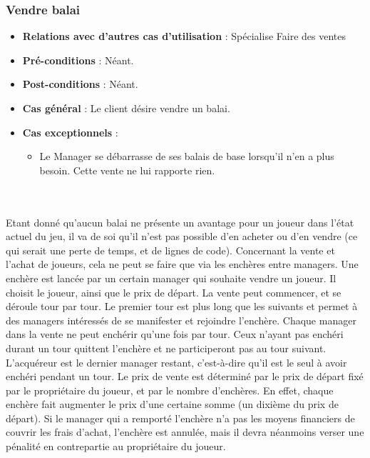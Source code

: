 \documentclass[a4paper,titlepage]{scrreprt}
\begin{document}
    \subsubsection{Vendre balai}
      \begin{itemize}
        \item \textbf{Relations avec d'autres cas d'utilisation}  : Spécialise Faire des ventes
        \item \textbf{Pré-conditions} : Néant.
        \item \textbf{Post-conditions} : Néant.
        \item \textbf{Cas général} : Le client désire vendre un balai.
        \item \textbf{Cas exceptionnels} : 
        \begin{itemize}
            \item Le Manager se débarrasse de ses balais de base lorsqu'il n'en a plus besoin. Cette vente ne lui rapporte rien.
          \end{itemize}
      \end{itemize}


     \\
     \\
     Etant donné qu'aucun balai ne présente un avantage pour un joueur dans l'état actuel du jeu, il va de soi qu'il n'est pas possible d'en acheter ou d'en vendre (ce qui serait une perte de temps, et de lignes de code). Concernant la vente et l'achat de joueurs, cela ne peut se faire que via les enchères entre managers. Une enchère est lancée par un certain manager qui souhaite vendre un joueur. Il choisit le joueur, ainsi que le prix de départ. La vente peut commencer, et se déroule tour par tour. Le premier tour est plus long que les suivants et permet à des managers intéressés de se manifester et rejoindre l'enchère. Chaque manager dans la vente ne peut enchérir qu'une fois par tour. Ceux n'ayant pas enchéri durant un tour quittent l'enchère et ne participeront pas au tour suivant. L'acquéreur est le dernier manager restant, c'est-à-dire qu'il est le seul à avoir enchéri pendant un tour. Le prix de vente est déterminé par le prix de départ fixé par le propriétaire du joueur, et par le nombre d'enchères. En effet, chaque enchère fait augmenter le prix d'une certaine somme (un dixième du prix de départ). Si le manager qui a remporté l'enchère n'a pas les moyens financiers de couvrir les frais d'achat, l'enchère est annulée, mais il devra néanmoins verser une pénalité en contrepartie au propriétaire du joueur.
\end{document}
